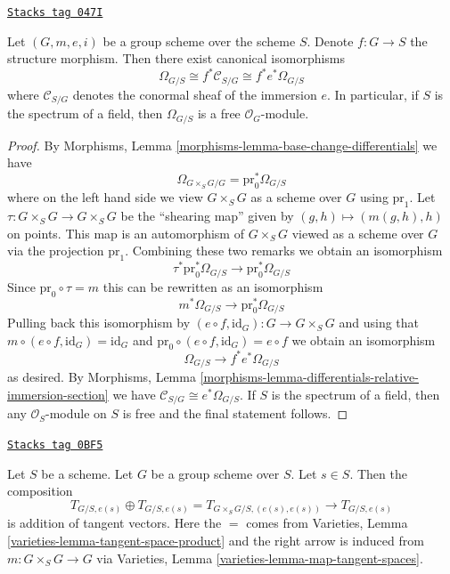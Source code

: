 \begin{lemma}
\label{groupoids-lemma-group-scheme-module-differentials}
\href{https://stacks.math.columbia.edu/tag/047I}{\texttt{Stacks tag 047I}}

\begin{reference}
\cite[Proposition 3.15]{BookAV}
\end{reference}
Let $(G, m, e, i)$ be a group scheme over the scheme $S$.
Denote $f : G \to S$ the structure morphism.
Then there exist canonical isomorphisms
$$
\Omega_{G/S} \cong f^*\mathcal{C}_{S/G} \cong f^*e^*\Omega_{G/S}
$$
where $\mathcal{C}_{S/G}$ denotes the conormal sheaf of the
immersion $e$. In particular, if $S$ is the spectrum of a field, then
$\Omega_{G/S}$ is a free $\mathcal{O}_G$-module.
\end{lemma}

\begin{proof}
By Morphisms, Lemma \ref{morphisms-lemma-base-change-differentials} we have
$$
\Omega_{G \times_S G/G} = \text{pr}_0^*\Omega_{G/S}
$$
where on the left hand side we view $G \times_S G$ as a scheme over $G$
using $\text{pr}_1$.
Let $\tau : G \times_S G \to G \times_S G$ be the ``shearing map''
given by $(g, h) \mapsto (m(g, h), h)$ on points. This map is an automorphism
of $G \times_S G$ viewed as a scheme over $G$ via the projection $\text{pr}_1$.
Combining these two remarks we obtain an isomorphism
$$
\tau^*\text{pr}_0^*\Omega_{G/S} \to \text{pr}_0^*\Omega_{G/S}
$$
Since $\text{pr}_0 \circ \tau = m$ this can be rewritten as an isomorphism
$$
m^*\Omega_{G/S} \to \text{pr}_0^*\Omega_{G/S}
$$
Pulling back this isomorphism by
$(e \circ f, \text{id}_G) : G \to G \times_S G$
and using that $m \circ (e \circ f, \text{id}_G) = \text{id}_G$
and $\text{pr}_0 \circ (e \circ f, \text{id}_G) = e \circ f$
we obtain an isomorphism
$$
\Omega_{G/S} \to f^*e^*\Omega_{G/S}
$$
as desired. By
Morphisms, Lemma \ref{morphisms-lemma-differentials-relative-immersion-section}
we have $\mathcal{C}_{S/G} \cong e^*\Omega_{G/S}$.
If $S$ is the spectrum of a field, then
any $\mathcal{O}_S$-module on $S$ is free
and the final statement follows.
\end{proof}

\begin{lemma}
\label{groupoids-lemma-group-scheme-addition-tangent-vectors}
\href{https://stacks.math.columbia.edu/tag/0BF5}{\texttt{Stacks tag 0BF5}}

Let $S$ be a scheme. Let $G$ be a group scheme over $S$.
Let $s \in S$. Then the composition
$$
T_{G/S, e(s)} \oplus T_{G/S, e(s)} = T_{G \times_S G/S, (e(s), e(s))}
\rightarrow T_{G/S, e(s)}
$$
is addition of tangent vectors. Here the $=$ comes from
Varieties, Lemma \ref{varieties-lemma-tangent-space-product}
and the right arrow is induced from $m : G \times_S G \to G$ via
Varieties, Lemma \ref{varieties-lemma-map-tangent-spaces}.
\end{lemma}


